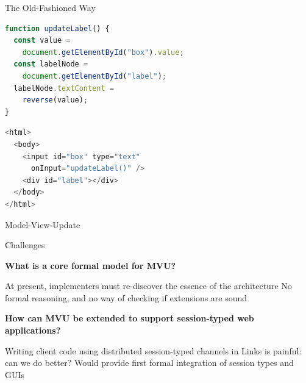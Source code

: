 \documentclass[11.5pt, aspectratio=169]{beamer}
\begin{document}
\begin{frame}[fragile]{The Old-Fashioned Way}


  \begin{minipage}{0.6\textwidth}
\begin{lstlisting}[language=JavaScript]
function updateLabel() {
  const value =
    document.getElementById("box").value;
  const labelNode =
    document.getElementById("label");
  labelNode.textContent =
    reverse(value);
}
\end{lstlisting}
\begin{lstlisting}[language=JavaScript]
<html>
  <body>
    <input id="box" type="text"
      onInput="updateLabel()" />
    <div id="label"></div>
  </body>
</html>
\end{lstlisting}%
\end{minipage}
\hfill
\begin{minipage}{0.35\textwidth}
\end{minipage}
\end{frame}

\begin{frame}{Model-View-Update}
\end{frame}

\begin{frame}{Challenges}

    \begin{fullpageitemize}
  \item {\Large \textbf{What is a core formal model for MVU?}}
    \begin{itemize}
      \itemR At present, implementers must re-discover the essence of the architecture
      \itemR No formal reasoning, and no way of checking if extensions are sound
    \end{itemize}
    \vspace{1em}
  \item {\Large \textbf{How can MVU be extended to support session-typed web applications?}}
    \begin{itemize}
      \itemR Writing client code using distributed session-typed channels in Links is painful: can we do better?
      \itemR Would provide first formal integration of session types and GUIs
    \end{itemize}
  \end{fullpageitemize}
\end{frame}
\end{document}
